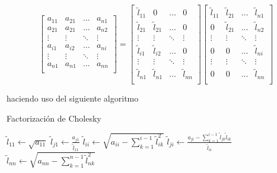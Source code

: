 \[
\begin{bmatrix}
    a_{11} & a_{21} & \ldots & a_{n1} \\
    a_{21} & a_{21} & \ldots & a_{n2} \\
    \vdots & \vdots & \ddots & \vdots \\
    a_{i1} & a_{i2} & \ldots & a_{ni} \\
    \vdots & \vdots & \ddots & \vdots \\
    a_{n1} & a_{n1} & \ldots & a_{nn} \\
\end{bmatrix}
=
\begin{bmatrix}
    \tilde{l}_{11} & 0 & \ldots & 0 \\
    \tilde{l}_{21} & \tilde{l}_{21} & \ldots & 0 \\
    \vdots & \vdots & \ddots & \vdots \\
    \tilde{l}_{i1} & \tilde{l}_{i2} & \ldots & 0 \\
    \vdots & \vdots & \ddots & \vdots \\
    \tilde{l}_{n1} & \tilde{l}_{n1} & \ldots & \tilde{l}_{nn} \\
\end{bmatrix}
\begin{bmatrix}
    \tilde{l}_{11} & \tilde{l}_{21} & \ldots & \tilde{l}_{n1} \\
    0 & \tilde{l}_{21} & \ldots & \tilde{l}_{n2} \\
    \vdots & \vdots & \ddots & \vdots \\
    0 & 0 & \ldots & \tilde{l}_{ni} \\
    \vdots & \vdots & \ddots & \vdots \\
    0 & 0 & \ldots & \tilde{l}_{nn} \\
\end{bmatrix}
\]

haciendo uso del siguiente algoritmo

\begin{algorithm}
\begin{algorithmic}
    \caption{Factorización de Cholesky}\label{alg:fact_cholesky}
    \State $\tilde{l}_{11} \gets \sqrt{a_{11}}$
        \State $\tilde{l}_{j1} \gets \frac{a_{j1}}{\tilde{l}_{11}}$
    \EndFor
        \State $\tilde{l}_{ii} \gets \sqrt{a_{ii} - \sum_{k=1}^{i-1}\tilde{l}_{ik}^{2}}$
            \State $\tilde{l}_{ji} \gets \frac{a_{ji} - \sum_{k=1}^{i-1}\tilde{l}_{jk}\tilde{l}_{ik}}{\tilde{l}_{ii}}$
        \EndFor
    \EndFor
    \State $\tilde{l}_{nn} \gets \sqrt{a_{nn} - \sum_{k=1}^{n-1}\tilde{l}_{nk}^{2}}$
\end{algorithmic}
\end{algorithm}
    
